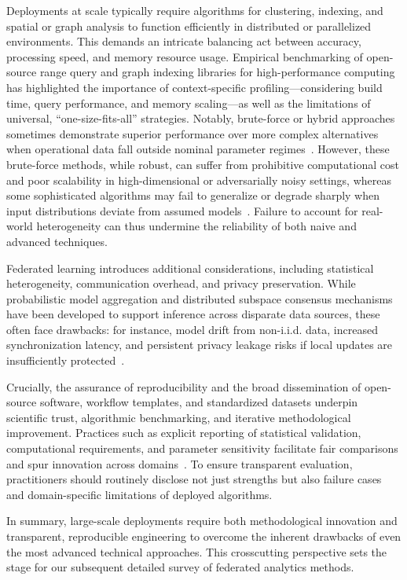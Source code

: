 \documentclass[sigconf]{acmart}
\begin{document}
Deployments at scale typically require algorithms for clustering, indexing, and spatial or graph analysis to function efficiently in distributed or parallelized environments. This demands an intricate balancing act between accuracy, processing speed, and memory resource usage. Empirical benchmarking of open-source range query and graph indexing libraries for high-performance computing has highlighted the importance of context-specific profiling---considering build time, query performance, and memory scaling---as well as the limitations of universal, ``one-size-fits-all'' strategies. Notably, brute-force or hybrid approaches sometimes demonstrate superior performance over more complex alternatives when operational data fall outside nominal parameter regimes~\cite{ref117}. However, these brute-force methods, while robust, can suffer from prohibitive computational cost and poor scalability in high-dimensional or adversarially noisy settings, whereas some sophisticated algorithms may fail to generalize or degrade sharply when input distributions deviate from assumed models~\cite{ref116,ref117}. Failure to account for real-world heterogeneity can thus undermine the reliability of both naive and advanced techniques.

Federated learning introduces additional considerations, including statistical heterogeneity, communication overhead, and privacy preservation. While probabilistic model aggregation and distributed subspace consensus mechanisms have been developed to support inference across disparate data sources, these often face drawbacks: for instance, model drift from non-i.i.d. data, increased synchronization latency, and persistent privacy leakage risks if local updates are insufficiently protected~\cite{ref118}.

Crucially, the assurance of reproducibility and the broad dissemination of open-source software, workflow templates, and standardized datasets underpin scientific trust, algorithmic benchmarking, and iterative methodological improvement. Practices such as explicit reporting of statistical validation, computational requirements, and parameter sensitivity facilitate fair comparisons and spur innovation across domains~\cite{ref116}. To ensure transparent evaluation, practitioners should routinely disclose not just strengths but also failure cases and domain-specific limitations of deployed algorithms.

In summary, large-scale deployments require both methodological innovation and transparent, reproducible engineering to overcome the inherent drawbacks of even the most advanced technical approaches. This crosscutting perspective sets the stage for our subsequent detailed survey of federated analytics methods.
\end{document}
